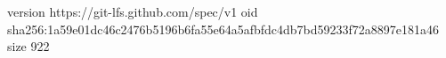 version https://git-lfs.github.com/spec/v1
oid sha256:1a59e01dc46c2476b5196b6fa55e64a5afbfdc4db7bd59233f72a8897e181a46
size 922
